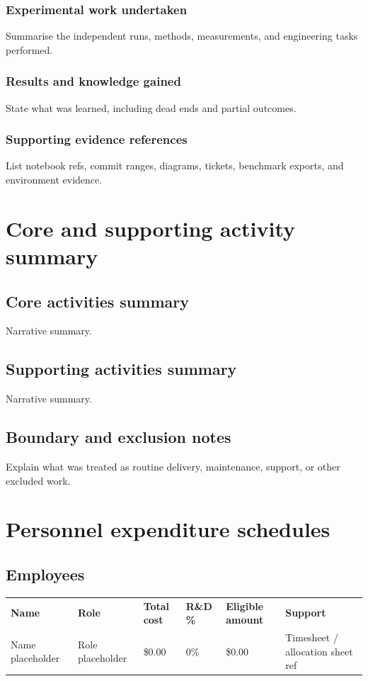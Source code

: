 \documentclass[11pt]{article}
\begin{document}
\subsubsection{Experimental work undertaken}
Summarise the independent runs, methods, measurements, and engineering tasks performed.

\subsubsection{Results and knowledge gained}
State what was learned, including dead ends and partial outcomes.

\subsubsection{Supporting evidence references}
List notebook refs, commit ranges, diagrams, tickets, benchmark exports, and environment evidence.

\section{Core and supporting activity summary}

\subsection{Core activities summary}
Narrative summary.

\subsection{Supporting activities summary}
Narrative summary.

\subsection{Boundary and exclusion notes}
Explain what was treated as routine delivery, maintenance, support, or other excluded work.

\section{Personnel expenditure schedules}
\subsection{Employees}
\begin{xltabular}{\textwidth}{L{2.8cm}L{2.4cm}L{1.9cm}L{1.8cm}L{2.0cm}Y}
\textbf{Name} & \textbf{Role} & \textbf{Total cost} & \textbf{R\&D \%} & \textbf{Eligible amount} & \textbf{Support} \\
{Name placeholder} & {Role placeholder} & {\$0.00} & {0\%} & {\$0.00} & {Timesheet / allocation sheet ref} \\
\end{xltabular}
\end{document}
